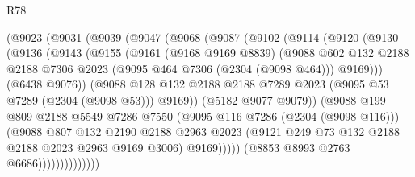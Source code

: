 \begin{lexlean}{R78}
\begin{coremodule}
                  (@9023
                    (@9031
                      (@9039
                        (@9047
                          (@9068
                            (@9087
                              (@9102
                                (@9114
                                  (@9120
                                    (@9130
                                      (@9136
                                        (@9143
                                          (@9155
                                            (@9161
                                              (@9168 @9169 @8839)
                                              (@9088
                                                @602
                                                @132
                                                @2188
                                                @2188
                                                @7306
                                                @2023
                                                (@9095 @464 @7306 (@2304 (@9098 @464)))
                                                @9169)))
                                          (@6438 @9076))
                                        (@9088
                                          @128
                                          @132
                                          @2188
                                          @2188
                                          @7289
                                          @2023
                                          (@9095 @53 @7289 (@2304 (@9098 @53)))
                                          @9169))
                                      (@5182 @9077 @9079))
                                    (@9088
                                      @199
                                      @809
                                      @2188
                                      @5549
                                      @7286
                                      @7550
                                      (@9095 @116 @7286 (@2304 (@9098 @116)))
                                      (@9088
                                        @807
                                        @132
                                        @2190
                                        @2188
                                        @2963
                                        @2023
                                        (@9121 @249 @73 @132 @2188 @2188 @2023 @2963 @9169 @3006)
                                        @9169)))))
                              (@8853 @8993 @2763 @6686))))))))))))))

\end{coremodule}
\end{lexlean}
